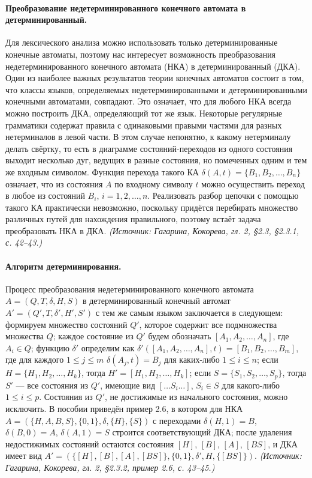 \documentclass[a4paper,12pt]{article}
\begin{document}
\paragraph{Преобразование недетерминированного конечного автомата в детерминированный.}
Для лексического анализа можно использовать только детерминированные конечные автоматы, поэтому нас интересует возможность преобразования недетерминированного конечного автомата (НКА) в детерминированный (ДКА). Один из наиболее важных результатов теории конечных автоматов состоит в том, что классы языков, определяемых недетерминированными и детерминированными конечными автоматами, совпадают. Это означает, что для любого НКА всегда можно построить ДКА, определяющий тот же язык. Некоторые регулярные грамматики содержат правила с одинаковыми правыми частями для разных нетерминалов в левой части. В этом случае непонятно, к какому нетерминалу делать свёртку, то есть в диаграмме состояний-переходов из одного состояния выходит несколько дуг, ведущих в разные состояния, но помеченных одним и тем же входным символом. Функция перехода такого КА \(\delta(A,t)=\{B_1,B_2,\ldots,B_n\}\) означает, что из состояния \(A\) по входному символу \(t\) можно осуществить переход в любое из состояний \(B_i\), \(i=1,2,\ldots,n\). Реализовать разбор цепочки с помощью такого КА практически невозможно, поскольку придётся перебирать множество различных путей для нахождения правильного, поэтому встаёт задача преобразовать НКА в ДКА.
\textit{(Источник: Гагарина, Кокорева, гл. 2, §2.3, §2.3.1, с. 42--43.)}

\paragraph{Алгоритм детерминирования.}
Процесс преобразования недетерминированного конечного автомата \(A=(Q,T,\delta,H,S)\) в детерминированный конечный автомат \(A'=(Q',T,\delta',H',S')\) с тем же самым языком заключается в следующем: формируем множество состояний \(Q'\), которое содержит все подмножества множества \(Q\); каждое состояние из \(Q'\) будем обозначать \([A_1,A_2,\ldots,A_n]\), где \(A_i\in Q\); функцию \(\delta'\) определим как \(\delta'([A_1,A_2,\ldots,A_n],t)=[B_1,B_2,\ldots,B_m]\), где для каждого \(1\le j\le m\) \(\delta(A_j,t)=B_j\) для каких-либо \(1\le i\le n\); если \(H=\{H_1,H_2,\ldots,H_k\}\), тогда \(H'=[H_1,H_2,\ldots,H_k]\); если \(S=\{S_1,S_2,\ldots,S_p\}\), тогда \(S'\) — все состояния из \(Q'\), имеющие вид \([\ldots S_i\ldots]\), \(S_i\in S\) для какого-либо \(1\le i\le p\). Состояния из \(Q'\), не достижимые из начального состояния, можно исключить. В пособии приведён пример 2.6, в котором для НКА \(A=(\{H,A,B,S\},\{0,1\},\delta,\{H\},\{S\})\) с переходами \(\delta(H,1)=B\), \(\delta(B,0)=A\), \(\delta(A,1)=S\) строится соответствующий ДКА; после удаления недостижимых состояний остаются состояния \([H]\), \([B]\), \([A]\), \([BS]\), и ДКА имеет вид \(A'=(\{[H],[B],[A],[BS]\},\{0,1\},\delta',H,\{[BS]\})\).
\textit{(Источник: Гагарина, Кокорева, гл. 2, §2.3.2, пример 2.6, с. 43--45.)}
\end{document}
